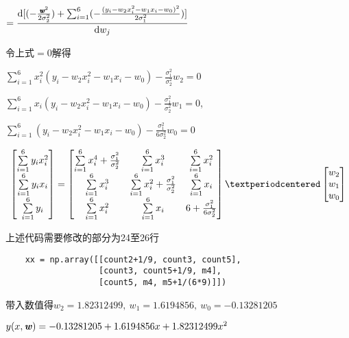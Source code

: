 \documentclass[UTF8]{ctexart}
\begin{document}
$\displaystyle{
  =\frac{\text{d}[(-\frac{\pmb{\emph{w}}^2}{2\sigma _{2}^2})+
  \sum_{i=1}^6 (-\frac{(y_{i}-w_{2}x_{i}^2-w_{1}x_{i}-w_{0})^2}{2\sigma _{1}^2})]}
  {\text{d}\emph{$w_{j}$}}
  }$

令上式$=0$解得

$\sum_{i=1}^6 x_{i}^2(y_{i}-w_{2}x_{i}^2-w_{1}x_{i}-w_{0})-\frac{\sigma_{1}^2}
  {\sigma_{2}^2}w_{2}=0$

$\sum_{i=1}^6 x_{i}(y_{i}-w_{2}x_{i}^2-w_{1}x_{i}-w_{0})-\frac{\sigma_{1}^2}
  {\sigma_{2}^2}w_{1}=0$,

$\sum_{i=1}^6(y_{i}-w_{2}x_{i}^2-w_{1}x_{i}-w_{0})-\frac{\sigma_{1}^2}
  {6\sigma_{2}^2}w_{0}=0$

$$
  \begin{bmatrix}
    \sum\limits_{i=1}\limits^6 y_{i}x_{i}^2 \\
    \sum\limits_{i=1}\limits^6 y_{i}x_{i}   \\
    \sum\limits_{i=1}\limits^6 y_{i}
  \end{bmatrix}
  =
  \begin{bmatrix}
    \sum\limits_{i=1}\limits^6 x_{i}^4 +\frac{\sigma_{1}^2}{\sigma_{2}^2} & \sum\limits_{i=1}\limits^6 x_{i}^3                                   & \sum\limits_{i=1}\limits^6 x_{i}^2   \\
    \sum\limits_{i=1}\limits^6 x_{i}^3                                    & \sum\limits_{i=1}\limits^6 x_{i}^2+\frac{\sigma_{1}^2}{\sigma_{2}^2} & \sum\limits_{i=1}\limits^6 x_{i}     \\
    \sum\limits_{i=1}\limits^6 x_{i}^2                                    & \sum\limits_{i=1}\limits^6 x_{i}                                     & 6+\frac{\sigma_{1}^2}{6\sigma_{2}^2}
  \end{bmatrix}
  ·
  \begin{bmatrix}
    \emph{$w_{2}$} \\
    \emph{$w_{1}$} \\
    \emph{$w_{0}$}
  \end{bmatrix}
$$

上述代码需要修改的部分为24至26行
\begin{lstlisting}
    xx = np.array([[count2+1/9, count3, count5], 
                   [count3, count5+1/9, m4], 
                   [count5, m4, m5+1/(6*9)]])
\end{lstlisting}

带入数值得$w_{2}=1.82312499,\ w_{1}=1.6194856,\ w_{0}=-0.13281205$

$y(x,\textbf{\emph{w}})=-0.13281205+1.6194856x+1.82312499x^2$
\end{document}
